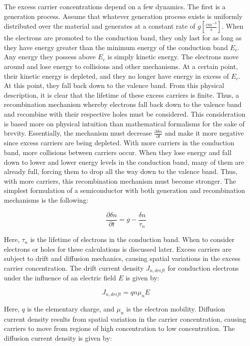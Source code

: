 The excess carrier concentrations depend on a few dynamics. The first is a generation process. Assume that whatever generation process exists is uniformly distributed over the material and generates at a constant rate of $g [\frac{cm^{-3}}{s}]$. When the electrons are promoted to the conduction band, they only last for as long as they have energy greater than the minimum energy of the conduction band $E_c$. Any energy they possess above $E_c$ is simply kinetic energy. The electrons move around and lose energy to collisions and other mechanisms. At a certain point, their kinetic energy is depleted, and they no longer have energy in excess of $E_c$. At this point, they fall back down to the valence band.
From this physical description, it is clear that the lifetime of these excess carriers is finite. Thus, a recombination mechanism whereby electrons fall back down to the valence band and recombine with their respective holes must be considered. This consideration is based more on physical intuition than mathematical formalisms for the sake of brevity. Essentially, the mechanism must decrease $\frac{\partial \delta n}{\partial t}$ and make it more negative since excess carriers are being depleted. With more carriers in the conduction band, more collisions between carriers occur. When they lose energy and fall down to lower and lower energy levels in the conduction band, many of them are already full, forcing them to drop all the way down to the valence band. Thus, with more carriers, this recombination mechanism must become stronger. The simplest formulation of a semiconductor with both generation and recombination mechanisms is the following:

\begin{equation}
	\label{eq:gen_and_rec}
	\frac{\partial \delta n}{\partial t} = g - \frac{\delta n}{\tau _n}
\end{equation}

Here, $\tau _n$ is the lifetime of electrons in the conduction band. When to consider electrons or holes for these calculations is discussed later.
Excess carriers are subject to drift and diffusion mechanics, causing spatial variations in the excess carrier concentration. The drift current density $J_{n,drift}$ for conduction electrons under the influence of an electric field $E$ is given by:

\begin{equation}
	\label{eq:drift}
	J_{n,drift} = qn\mu _nE
\end{equation}

Here, $q$ is the elementary charge, and $\mu _n$ is the electron mobility. Diffusion current density results from spatial variation in the carrier concentration, causing carriers to move from regions of high concentration to low concentration. The diffusion current density is given by:

